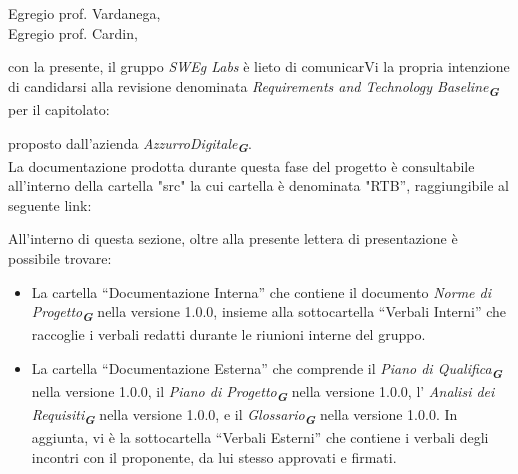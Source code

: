 
\fancyfoot[C]{\thepage} %



Egregio prof. Vardanega, \\
Egregio prof. Cardin, \\
\vspace{0.5cm}

con la presente, il gruppo \emph{SWEg Labs} è lieto di comunicarVi la propria intenzione di candidarsi alla revisione denominata \emph{Requirements and Technology Baseline}\textsubscript{\textit{\textbf{G}}} per il capitolato:\\
\begin{center}
\end{center}
proposto dall’azienda \emph{AzzurroDigitale}\textsubscript{\textit{\textbf{G}}}.\\
La documentazione prodotta durante questa fase del progetto è consultabile all’interno della cartella "src"
la cui cartella è denominata "RTB”, raggiungibile al seguente link: 
\begin{center}
\end{center}
All’interno di questa sezione, oltre alla presente lettera di presentazione è possibile trovare:
\begin{itemize}
\item La cartella “Documentazione Interna” che contiene il documento \emph{Norme di Progetto}\textsubscript{\textit{\textbf{G}}} nella versione 1.0.0, insieme alla sottocartella “Verbali Interni” che raccoglie i verbali redatti durante le riunioni interne del gruppo.
\item La cartella “Documentazione Esterna” che comprende il \emph{Piano di Qualifica}\textsubscript{\textit{\textbf{G}}} nella versione 1.0.0, il \emph{Piano di Progetto}\textsubscript{\textit{\textbf{G}}} nella versione 1.0.0, l' \emph{Analisi dei Requisiti}\textsubscript{\textit{\textbf{G}}} nella versione 1.0.0, e il \emph{Glossario}\textsubscript{\textit{\textbf{G}}} nella versione 1.0.0. In aggiunta, vi è la sottocartella “Verbali Esterni” che contiene i verbali degli incontri con il proponente, da lui stesso approvati e firmati.
\end{itemize}
